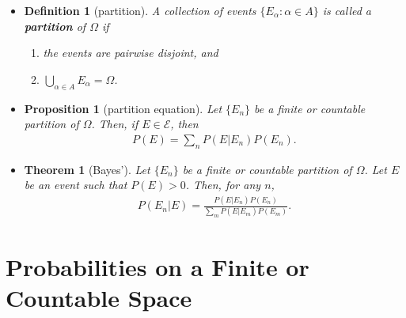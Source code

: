 \documentclass[10pt]{article}
\newtheorem{theorem}[lemma]{Theorem}
\newtheorem{definition}[lemma]{Definition}
\newtheorem{proposition}[lemma]{Proposition}
\numberwithin{lemma}{section}
\newcommand{\mcal}[1]{\mathcal{#1}}
\begin{document}
\begin{itemize}
  \item \begin{definition}[partition]
    A collection of events $\{ E_\alpha : \alpha \in A \}$ is called a {\bf partition} of $\Omega$ if 
    \begin{enumerate}
      \item the events are pairwise disjoint, and 
      \item $\bigcup_{\alpha \in A} E_\alpha = \Omega$.
    \end{enumerate}  
  \end{definition}

  \item \begin{proposition}[partition equation]
    Let $\{ E_n \}$ be a finite or countable partition of $\Omega$. Then, if $E \in \mcal{E}$, then
    \begin{align*}
      P(E) = \sum_{n} P(E|E_n) P(E_n).
    \end{align*}
  \end{proposition}

  \item \begin{theorem}[Bayes']
    Let $\{ E_n \}$ be a finite or countable partition of $\Omega$. Let $E$ be an event such that $P(E) > 0$. Then, for any $n$,
    \begin{align*}
      P(E_n | E) = \frac{P(E | E_n) P(E_n)}{\sum_{m} P(E|E_m)P(E_m)}.
    \end{align*}
  \end{theorem}
\end{itemize}

\section{Probabilities on a Finite or Countable Space}
\end{document}

